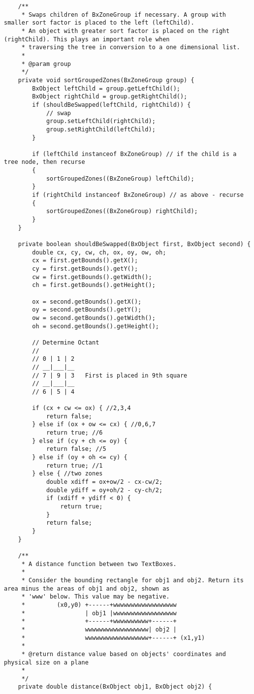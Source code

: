 \begin{appendices}
\begin{lstlisting}
    /**
     * Swaps children of BxZoneGroup if necessary. A group with smaller sort factor is placed to the left (leftChild).
     * An object with greater sort factor is placed on the right (rightChild). This plays an important role when
     * traversing the tree in conversion to a one dimensional list.
     *
     * @param group
     */
    private void sortGroupedZones(BxZoneGroup group) {
        BxObject leftChild = group.getLeftChild();
        BxObject rightChild = group.getRightChild();
        if (shouldBeSwapped(leftChild, rightChild)) {
            // swap
            group.setLeftChild(rightChild);
            group.setRightChild(leftChild);
        }
        
        if (leftChild instanceof BxZoneGroup) // if the child is a tree node, then recurse
        {
            sortGroupedZones((BxZoneGroup) leftChild);
        }
        if (rightChild instanceof BxZoneGroup) // as above - recurse
        {
            sortGroupedZones((BxZoneGroup) rightChild);
        }
    }

    private boolean shouldBeSwapped(BxObject first, BxObject second) {
        double cx, cy, cw, ch, ox, oy, ow, oh;
        cx = first.getBounds().getX();
        cy = first.getBounds().getY();
        cw = first.getBounds().getWidth();
        ch = first.getBounds().getHeight();

        ox = second.getBounds().getX();
        oy = second.getBounds().getY();
        ow = second.getBounds().getWidth();
        oh = second.getBounds().getHeight();

        // Determine Octant
        //
        // 0 | 1 | 2
        // __|___|__
        // 7 | 9 | 3   First is placed in 9th square
        // __|___|__
        // 6 | 5 | 4

        if (cx + cw <= ox) { //2,3,4
        	return false; 
        } else if (ox + ow <= cx) { //0,6,7
        	return true; //6
        } else if (cy + ch <= oy) {
            return false; //5
        } else if (oy + oh <= cy) {
            return true; //1
        } else { //two zones
            double xdiff = ox+ow/2 - cx-cw/2;
            double ydiff = oy+oh/2 - cy-ch/2;
            if (xdiff + ydiff < 0) {
                return true;
            }
            return false;
        }
    }

    /**
     * A distance function between two TextBoxes.
     *
     * Consider the bounding rectangle for obj1 and obj2. Return its area minus the areas of obj1 and obj2, shown as
     * 'www' below. This value may be negative. 
     *         (x0,y0) +------+wwwwwwwwwwwwwwwwww 
     *                 | obj1 |wwwwwwwwwwwwwwwwww
     *                 +------+wwwwwwwwww+------+
     *                 wwwwwwwwwwwwwwwwww| obj2 |
     *                 wwwwwwwwwwwwwwwwww+------+ (x1,y1)
     *
     * @return distance value based on objects' coordinates and physical size on a plane
     *
     */
    private double distance(BxObject obj1, BxObject obj2) {


\end{lstlisting}
\end{appendices}
